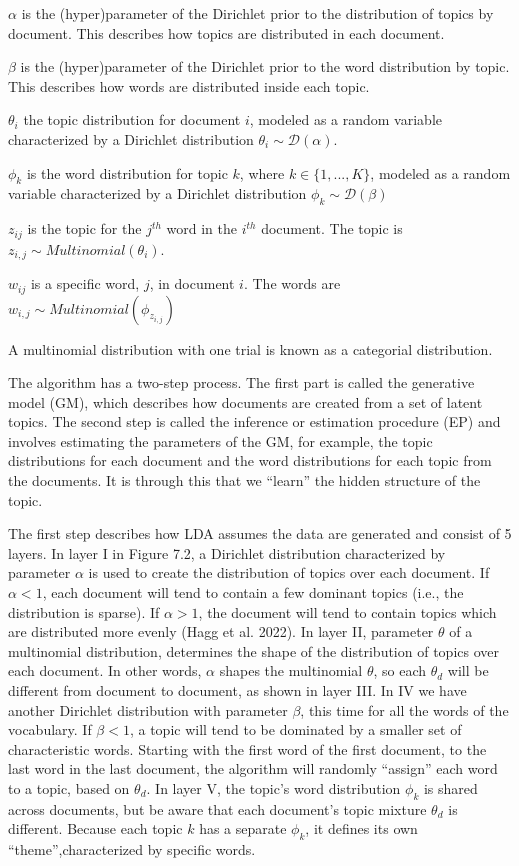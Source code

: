 \(\alpha\) is the (hyper)parameter of the Dirichlet prior to the distribution of topics by document. This describes how topics are
distributed in each document.

\(\beta\) is the (hyper)parameter of the Dirichlet prior to the
word distribution by topic. This describes how words are distributed
inside each topic.

\(\theta_i\) the topic distribution for document \(i\), modeled as a
random variable characterized by a Dirichlet distribution
\(\theta_i \sim \mathcal{D}(\alpha)\).

\(\phi_k\) is the word distribution for topic \(k\), where
\(k \in \{1,...,K\}\), modeled as a random variable characterized by a
Dirichlet distribution \(\phi_k \sim \mathcal{D}(\beta)\)

\(z_{ij}\) is the topic for the \(j^{th}\) word in the \(i^{th}\) document.
The topic is \(z_{i,j} \sim Multinomial(\theta_{i})\).

\(w_{ij}\) is a specific word, \(j\), in document \(i\). The words are
\(w_{i,j} \sim Multinomial(\phi_{z_{i,j}})\)

A multinomial
distribution with one trial is known as a categorial distribution.

The algorithm has a two-step process. The first part is
called the generative model (GM), which describes how documents are
created from a set of latent topics. The second step is called the inference
or estimation procedure (EP) and involves estimating the parameters of
the GM, for example, the topic distributions for each document and the
word distributions for each topic from the documents. It is through this
that we ``learn'' the hidden structure of the topic.

The first step describes how LDA assumes the data are generated and
consist of 5 layers. In layer I in Figure 7.2, a Dirichlet distribution characterized by
parameter \(\alpha\) is used to create the distribution of topics over
each document. If \(\alpha <1\), each document will tend to contain a
few dominant topics (i.e., the distribution is sparse). If
\(\alpha > 1\), the document will tend to contain topics which are distributed
more evenly (Hagg et al. 2022). In layer II, parameter \(\theta\) of a
multinomial distribution, determines the shape of the distribution of
topics over each document. In other words, \(\alpha\) shapes the
multinomial \(\theta\), so each \(\theta_d\) will be different from
document to document, as shown in layer III. In IV we have another
Dirichlet distribution with parameter \(\beta\), this time for all the
words of the vocabulary. If \(\beta<1\), a topic will tend to be
dominated by a smaller set of characteristic words. Starting with the
first word of the first document, to the last word in the last document,
the algorithm will randomly ``assign'' each word to a
topic, based on \(\theta_d\). In layer V, the topic's word distribution
\(\phi_k\) is shared across documents, but be aware that each document's
topic mixture \(\theta_d\) is different. Because each topic \(k\) has a
separate \(\phi_k\), it defines its own ``theme'',characterized by
specific words.

